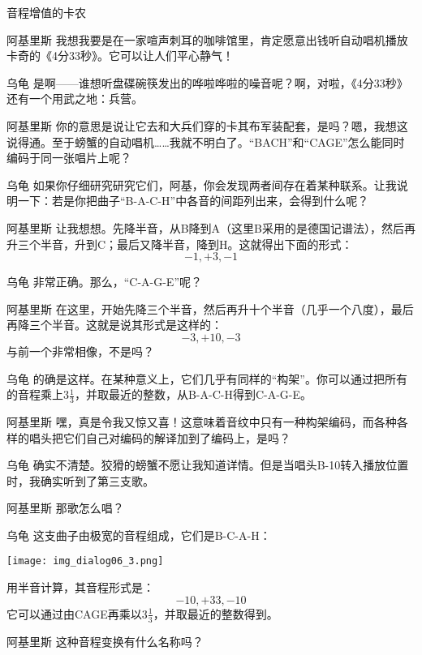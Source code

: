 \begin{dialog}{音程增值的卡农}
\begin{dialogue}
\item[阿基里斯]我想我要是在一家喧声刺耳的咖啡馆里，肯定愿意出钱听自动唱机播放卡奇的《4分33秒》。它可以让人们平心静气！

\item[乌龟]是啊——谁想听盘碟碗筷发出的哗啦哗啦的噪音呢？啊，对啦，《4分33秒》还有一个用武之地：兵营。

\item[阿基里斯]你的意思是说让它去和大兵们穿的卡其布军装配套，是吗？嗯，我想这说得通。至于螃蟹的自动唱机……我就不明白了。“BACH”和“CAGE”怎么能同时编码于同一张唱片上呢？

\item[乌龟]如果你仔细研究研究它们，阿基，你会发现两者间存在着某种联系。让我说明一下：若是你把曲子“B-A-C-H”中各音的间距列出来，会得到什么呢？

\item[阿基里斯]让我想想。先降半音，从B降到A（这里B采用的是德国记谱法），然后再升三个半音，升到C；最后又降半音，降到H。这就得出下面的形式：
  \[
  -1, +3, -1
  \]
\item[乌龟]非常正确。那么，“C-A-G-E”呢？

\item[阿基里斯]在这里，开始先降三个半音，然后再升十个半音（几乎一个八度），最后再降三个半音。这就是说其形式是这样的：
  \[
  -3, +10, -3
  \]
  与前一个非常相像，不是吗？

\item[乌龟]的确是这样。在某种意义上，它们几乎有同样的“构架”。你可以通过把所有的音程乘上$3\frac13$，并取最近的整数，从B-A-C-H得到C-A-G-E。

\item[阿基里斯]嘿，真是令我又惊又喜！这意味着音纹中只有一种构架编码，而各种各样的唱头把它们自己对编码的解译加到了编码上，是吗？

\item[乌龟]确实不清楚。狡猾的螃蟹不愿让我知道详情。但是当唱头B-10转入播放位置时，我确实听到了第三支歌。

\item[阿基里斯]那歌怎么唱？

\item[乌龟]这支曲子由极宽的音程组成，它们是B-C-A-H：
  \begin{center}
  \texttt{[image: img\_dialog06\_3.png]}
  \end{center}
  用半音计算，其音程形式是：
  \[
  -10, +33, -10
  \]
  它可以通过由CAGE再乘以$3\frac13$，并取最近的整数得到。

\item[阿基里斯]这种音程变换有什么名称吗？


\end{dialogue}
\end{dialog}
